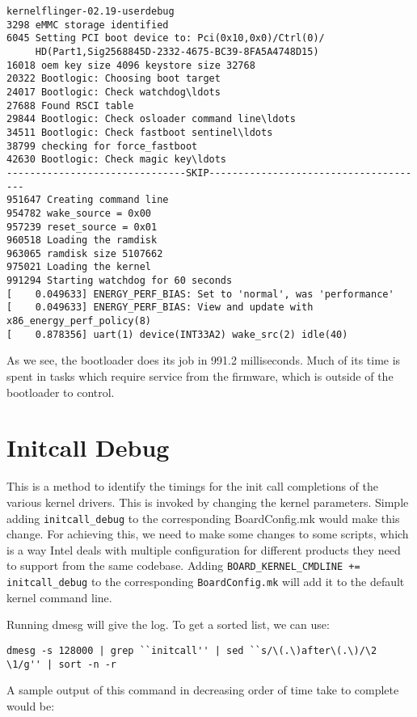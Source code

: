 \begin{Verbatim}[fontsize=\small]
kernelflinger-02.19-userdebug
3298 eMMC storage identified
6045 Setting PCI boot device to: Pci(0x10,0x0)/Ctrl(0)/
     HD(Part1,Sig2568845D-2332-4675-BC39-8FA5A4748D15)
16018 oem key size 4096 keystore size 32768
20322 Bootlogic: Choosing boot target
24017 Bootlogic: Check watchdog\ldots
27688 Found RSCI table
29844 Bootlogic: Check osloader command line\ldots
34511 Bootlogic: Check fastboot sentinel\ldots
38799 checking for force_fastboot
42630 Bootlogic: Check magic key\ldots
-------------------------------SKIP--------------------------------------
951647 Creating command line
954782 wake_source = 0x00
957239 reset_source = 0x01
960518 Loading the ramdisk
963065 ramdisk size 5107662
975021 Loading the kernel
991294 Starting watchdog for 60 seconds
[    0.049633] ENERGY_PERF_BIAS: Set to 'normal', was 'performance'
[    0.049633] ENERGY_PERF_BIAS: View and update with x86_energy_perf_policy(8)
[    0.878356] uart(1) device(INT33A2) wake_src(2) idle(40)
\end{Verbatim}

As we see, the bootloader does its job in 991.2 milliseconds.
Much of its time is spent in tasks which require service from the
firmware, which is outside of the bootloader to control.

\section {Initcall Debug}

This is a method to identify the timings for the init call completions
of the various kernel drivers. This is invoked by changing the kernel
parameters. Simple adding \texttt{initcall\_debug} to the corresponding
BoardConfig.mk would make this change. For achieving this, we need
to make some changes to some scripts, which is a way Intel deals with
multiple configuration for different products they need to support from
the same codebase. Adding \texttt{BOARD\_KERNEL\_CMDLINE += initcall\_debug}
to the corresponding \texttt{BoardConfig.mk} will add it to the default
kernel command line.

Running dmesg will give the log. To get a sorted list, we can use:
\begin{Verbatim}[fontsize=\small]
dmesg -s 128000 | grep ``initcall'' | sed ``s/\(.\)after\(.\)/\2 \1/g'' | sort -n -r
\end{Verbatim}

A sample output of this command in decreasing order of time take to complete would be:

